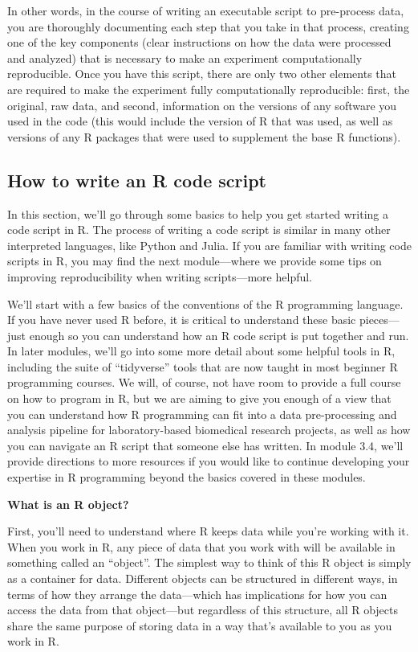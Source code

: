 \documentclass[]{tufte-book}
\begin{document}
In other words, in the course of writing an executable script to pre-process
data, you are thoroughly documenting each step that you take in that process,
creating one of the key components (clear instructions on how the data were
processed and analyzed) that is necessary to make an experiment computationally
reproducible. Once you have this script, there are only two other elements
that are required to make the experiment fully computationally reproducible:
first, the original, raw data, and second, information on the versions of
any software you used in the code (this would include the version of R that
was used, as well as versions of any R packages that were used to
supplement the base R functions).

\subsection{How to write an R code script}\label{how-to-write-an-r-code-script}

In this section, we'll go through some basics to help you get started writing a
code script in R. The process of writing a code script is similar in many other
interpreted languages, like Python and Julia. If you are familiar with writing
code scripts in R, you may find the next module---where we provide some tips on
improving reproducibility when writing scripts---more helpful.

We'll start with a few basics of the conventions of the R programming language.
If you have never used R before, it is critical to understand these basic
pieces---just enough so you can understand how an R code script is put together
and run. In later modules, we'll go into some more detail about some helpful
tools in R, including the suite of ``tidyverse''
tools that are now taught in most beginner R programming courses. We will, of
course, not have room to provide a full course on how to program in R, but we
are aiming to give you enough of a view that you can understand how R
programming can fit into a data pre-processing and analysis pipeline for
laboratory-based biomedical research projects, as well as how you can navigate
an R script that someone else has written. In module 3.4, we'll provide
directions to more resources if you would like to continue developing your
expertise in R programming beyond the basics covered in these modules.

\textbf{What is an R object?}

First, you'll need to understand where R keeps data while you're working with
it. When you work in R, any piece of data that you work with will be available
in something called an ``object''. The simplest way to think of this R object is
simply as a container for data. Different objects can be structured in different
ways, in terms of how they arrange the data---which has implications for how
you can access the data from that object---but regardless of this structure, all
R objects share the same purpose of storing data in a way that's available to
you as you work in R.
\end{document}

